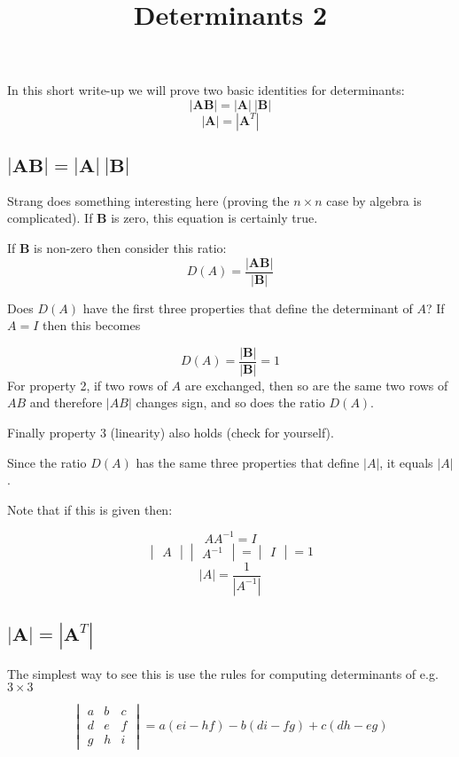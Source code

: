 \documentclass[11pt, oneside]{article}
\title{Determinants 2}
\date{}
\begin{document}
\maketitle
\Large

In this short write-up we will prove two basic identities for determinants:
\[ |\mathbf{AB}| = |\mathbf{A}|\ |\mathbf{B}| \]
\[ |\mathbf{A}| = |\mathbf{A}^T| \]

\subsection*{$|\mathbf{AB}| = |\mathbf{A}|\ |\mathbf{B}|$}

Strang does something interesting here (proving the $n \times n$ case by algebra is complicated).  If $\mathbf{B}$ is zero, this equation is certainly true.

If $\mathbf{B}$ is non-zero then consider this ratio:
\[ D(A) = \frac{|\mathbf{AB}|}{|\mathbf{B}|} \]  

Does $D(A)$ have the first three properties that define the determinant of $A$?  If $A=I$ then this becomes

\[ D(A) = \frac{|\mathbf{B}|}{|\mathbf{B}|} = 1 \]  For property 2, if two rows of $A$ are exchanged, then so are the same two rows of $AB$ and therefore $|AB|$ changes sign, and so does the ratio $D(A)$.

Finally property 3 (linearity) also holds (check for yourself).

Since the ratio $D(A)$ has the same three properties that define $|A|$, it equals $|A|$.

Note that if this is given then:

\[ A A^{-1} = I \]
\[
\begin{vmatrix}
A
\end{vmatrix}
\begin{vmatrix}
A^{-1}
\end{vmatrix}
=
\begin{vmatrix}
I
\end{vmatrix}
= 1
\]
\[ |A| = \frac{1}{|A^{-1}|} \]

\subsection*{$|\mathbf{A}| = |\mathbf{A}^T|$}

The simplest way to see this is use the rules for computing determinants of e.g. $3 \times 3$

\[
\begin{vmatrix}
a & b & c \\
d & e & f \\
g & h & i
\end{vmatrix}
=
a(ei - hf) - b(di - fg) + c(dh - eg) \]
\end{document}

